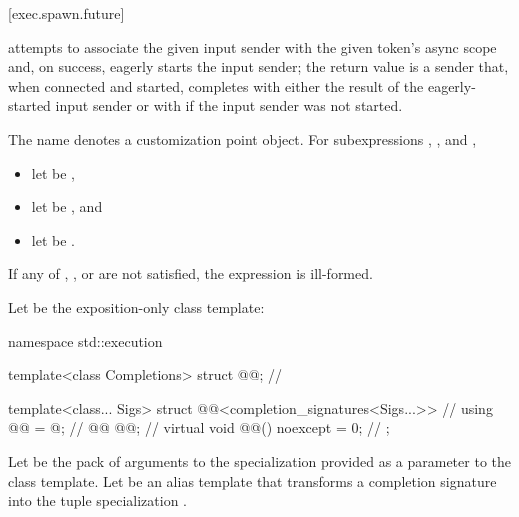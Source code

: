 [exec.spawn.future]{}

\pnum
{} attempts to associate the given input sender
with the given token's async scope and, on success,
eagerly starts the input sender;
the return value is a sender that, when connected and started,
completes with either
the result of the eagerly-started input sender or with
 if the input sender was not started.

\pnum
The name  denotes a customization point object.
For subexpressions , , and ,
\begin{itemize}
\item let  be ,
\item let  be , and
\item let  be .
\end{itemize}
If any of
,
, or
are not satisfied,
the expression  is ill-formed.

\pnum
Let  be the exposition-only class template:

%
\begin{codeblock}
namespace std::execution {
  template<class Completions>
  struct @@;                                   // \expos

  template<class... Sigs>
  struct @@<completion_signatures<Sigs...>> {  // \expos
    using @@ = @\seebelow@;                                    // \expos
    @@ @@;                                               // \expos
    virtual void @@() noexcept = 0;                           // \expos
  };
}
\end{codeblock}

\pnum
Let  be the pack of arguments to
the  specialization provided as
a parameter to the  class template.
Let  be an alias template that
transforms a completion signature 
into the tuple specialization .

